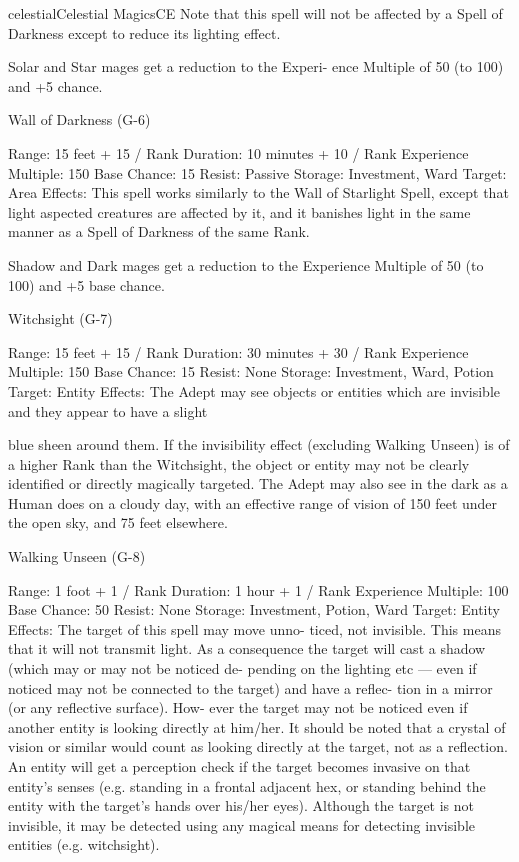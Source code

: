 \begin{College}[1.3]{celestial}{Celestial Magics}{CE}
Note  that this  spell  will  not  be  affected  by  a  Spell 
of Darkness except to reduce its lighting effect. 

Solar and Star mages get a reduction to the Experi-
ence  Multiple  of  50  (to  100)  and  +5%
chance. 

Wall of Darkness (G-6) 

Range: 15 feet + 15 / Rank 
Duration: 10 minutes + 10 / Rank 
Experience Multiple: 150 
Base Chance: 15%
Resist: Passive 
Storage: Investment, Ward 
Target: Area 
Effects:  This  spell  works  similarly  to  the  Wall  of 
Starlight Spell, except that light aspected creatures 
are affected by it, and it banishes light in the same 
manner as a Spell of Darkness of the same Rank. 

Shadow  and  Dark  mages  get  a  reduction  to  the 
Experience  Multiple  of  50  (to  100)  and  +5%
base chance. 

Witchsight (G-7) 

Range: 15 feet + 15 / Rank 
Duration: 30 minutes + 30 / Rank 
Experience Multiple: 150 
Base Chance: 15%
Resist: None 
Storage: Investment, Ward, Potion 
Target: Entity 
Effects:  The  Adept  may  see  objects  or  entities 
which are invisible and they appear to have a slight 

blue  sheen  around  them.  If  the  invisibility  effect 
(excluding  Walking  Unseen)  is  of  a  higher  Rank 
than the Witchsight, the object or entity may not be 
clearly  identified  or  directly  magically  targeted. 
The  Adept  may  also  see  in  the  dark  as  a  Human 
does  on  a  cloudy  day,  with  an  effective  range  of 
vision of 150 feet under the open sky, and 75 feet 
elsewhere. 

Walking Unseen (G-8) 

Range: 1 foot + 1 / Rank 
Duration: 1 hour + 1 / Rank 
Experience Multiple: 100 
Base Chance: 50%
Resist: None 
Storage: Investment, Potion, Ward 
Target: Entity 
Effects:  The  target  of  this  spell  may  move  unno-
ticed,  not  invisible.  This  means  that  it  will  not 
transmit light. As a consequence the target will cast 
a  shadow  (which  may  or  may  not  be  noticed  de-
pending on the lighting etc — even if noticed may 
not  be  connected  to  the  target)  and  have  a  reflec-
tion  in  a  mirror  (or  any  reflective  surface).  How-
ever  the  target  may  not be noticed  even  if  another 
entity  is  looking  directly  at  him/her.  It  should  be 
noted  that  a  crystal  of  vision  or  similar  would 
count  as  looking  directly  at  the  target,  not  as  a 
reflection.  An  entity  will  get  a  perception check if 
the target becomes invasive on that entity’s senses 
(e.g. standing in a frontal adjacent hex, or standing 
behind  the  entity  with  the  target’s  hands  over 
his/her eyes). Although the target is not invisible, it 
may  be  detected  using  any  magical  means  for 
detecting invisible entities (e.g. witchsight). 


\end{College}
